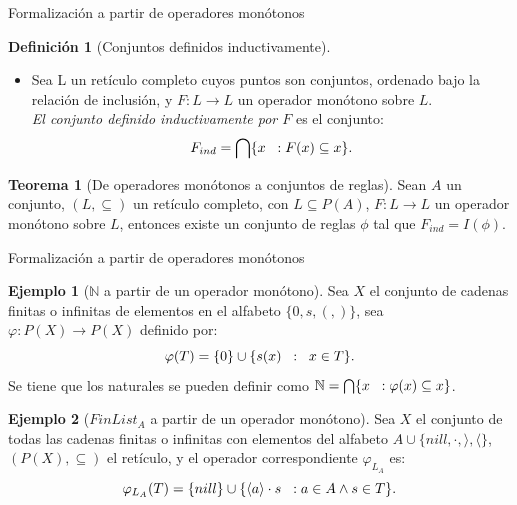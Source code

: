 \documentclass[dvipsnames, 8pt]{beamer} %
\theoremstyle{plain}
\newcommand{\N}{\mathbb{N}}
\theoremstyle{definition}
\newtheorem{teo}{Teorema}
\newtheorem{defi}{Definición}
\newtheorem{ejemplo}{Ejemplo}
\begin{document}
\begin{frame}{Formalización a partir de operadores monótonos}
    \begin{defi}[Conjuntos definidos inductivamente]
        \begin{itemize}
            \item Sea L un retículo completo cuyos puntos son conjuntos, ordenado bajo la relación de inclusión, y $F:L\rightarrow L$ un operador monótono sobre $L$.\\ \pause
            \emph{El conjunto definido inductivamente por $F$} es el conjunto:
            $$F_{ind} = \bigcap \{x \hspace{2mm}:F(x)\subseteq x\}.$$
        \end{itemize}
    \end{defi}\pause
    \begin{teo}[De operadores monótonos a conjuntos de reglas]
        Sean $A$ un conjunto, $(L, \subseteq)$ un retículo completo, con $L\subseteq P(A)$, $F: L \to L$ un operador monótono sobre $L$, entonces existe un conjunto de reglas $\phi$ tal que $F_{ind} = I(\phi)$.
    \end{teo}
\end{frame}

\begin{frame}{Formalización a partir de operadores monótonos}
    \begin{ejemplo}[$\N$ a partir de un operador monótono]
        Sea $X$ el conjunto de cadenas finitas o infinitas de elementos en el alfabeto $\{0, s, (, )\} $, sea $\varphi:P(X)\longrightarrow P(X)$ definido por:
        $$\varphi(T)=\{0\} \cup \{s(x)\hspace{2mm}:\hspace{2mm}x\in T\}.$$
        Se tiene que los naturales se pueden definir como
        $\N=\bigcap \{x \hspace{2mm}: \varphi(x)\subseteq x\}$.
    \end{ejemplo}\pause
    \begin{ejemplo}[$FinList_{A}$ a partir de un operador monótono]
        Sea $X$ el conjunto de todas las cadenas finitas o infinitas con elementos del alfabeto $A\cup\{nill, \cdot, \rangle, \langle\}$, $(P(X),\subseteq)$ el retículo, y el operador correspondiente $\varphi_{L_A}$ es:
        $$\varphi_{L_A}(T) = \{ nill\} \cup \{\langle a\rangle \cdot s \hspace{2mm}: a\in A \land s \in T \}.$$
\end{ejemplo}\end{frame}
\end{document}

